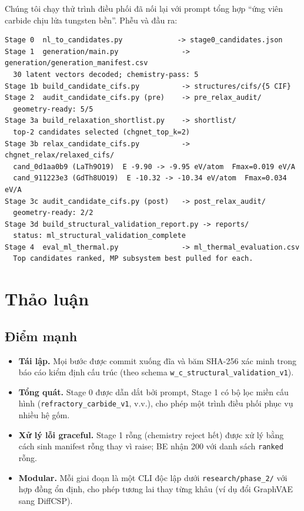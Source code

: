 \documentclass[11pt,a4paper]{report}
\begin{document}
Chúng tôi chạy thử trình điều phối đã nối lại với prompt tổng hợp
``ứng viên carbide chịu lửa tungsten bền''. Phễu và đầu ra:

\begin{lstlisting}[language={},caption={Trích đoạn stdout pipeline.},label={lst:runout}]
Stage 0  nl_to_candidates.py             -> stage0_candidates.json
Stage 1  generation/main.py               -> generation/generation_manifest.csv
  30 latent vectors decoded; chemistry-pass: 5
Stage 1b build_candidate_cifs.py          -> structures/cifs/{5 CIF}
Stage 2  audit_candidate_cifs.py (pre)    -> pre_relax_audit/
  geometry-ready: 5/5
Stage 3a build_relaxation_shortlist.py    -> shortlist/
  top-2 candidates selected (chgnet_top_k=2)
Stage 3b relax_candidate_cifs.py          -> chgnet_relax/relaxed_cifs/
  cand_0d1aa0b9 (LaTh9O19)  E -9.90 -> -9.95 eV/atom  Fmax=0.019 eV/A
  cand_911223e3 (GdTh8UO19)  E -10.32 -> -10.34 eV/atom  Fmax=0.034 eV/A
Stage 3c audit_candidate_cifs.py (post)   -> post_relax_audit/
  geometry-ready: 2/2
Stage 3d build_structural_validation_report.py -> reports/
  status: ml_structural_validation_complete
Stage 4  eval_ml_thermal.py               -> ml_thermal_evaluation.csv
  Top candidates ranked, MP subsystem best pulled for each.
\end{lstlisting}

\chapter{Thảo luận}

\section{Điểm mạnh}

\begin{itemize}[leftmargin=*,itemsep=2pt]
\item \textbf{Tái lập.} Mọi bước được commit xuống đĩa và băm SHA-256 xác minh trong báo cáo
      kiểm định cấu trúc (theo schema \texttt{w\_c\_structural\_validation\_v1}).
\item \textbf{Tổng quát.} Stage 0 được dẫn dắt bởi prompt, Stage 1 có bộ lọc miền cấu hình
      (\texttt{refractory\_carbide\_v1}, v.v.), cho phép một trình điều phối phục vụ
      nhiều hệ gốm.
\item \textbf{Xử lý lỗi graceful.} Stage 1 rỗng (chemistry reject hết) được xử lý bằng cách
      sinh manifest rỗng thay vì raise; BE nhận 200 với danh sách \texttt{ranked} rỗng.
\item \textbf{Modular.} Mỗi giai đoạn là một CLI độc lập dưới \texttt{research/phase\_2/}
      với hợp đồng ổn định, cho phép tương lai thay từng khâu (ví dụ đổi GraphVAE sang
      DiffCSP).
\end{itemize}
\end{document}
